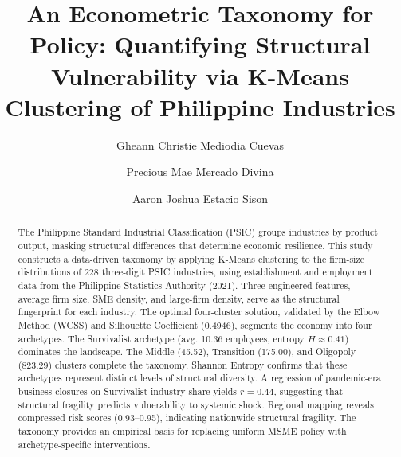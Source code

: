 \documentclass[acmtog, nonacm]{acmart}
\begin{document}
\title{\textbf{An Econometric Taxonomy for Policy: Quantifying Structural Vulnerability via K-Means Clustering of Philippine Industries}}


\author{Gheann Christie Mediodia Cuevas}

\author{Precious Mae Mercado Divina}

\author{Aaron Joshua Estacio Sison}



\begin{abstract}
The Philippine Standard Industrial Classification (PSIC) groups industries by product output, masking structural differences that determine economic resilience. This study constructs a data-driven taxonomy by applying K-Means clustering to the firm-size distributions of 228 three-digit PSIC industries, using establishment and employment data from the Philippine Statistics Authority (2021). Three engineered features, average firm size, SME density, and large-firm density, serve as the structural fingerprint for each industry. The optimal four-cluster solution, validated by the Elbow Method (WCSS) and Silhouette Coefficient (0.4946), segments the economy into four archetypes. The Survivalist archetype (avg. 10.36 employees, entropy \texorpdfstring{$H \approx 0.41$}{H is approximately 0.41}) dominates the landscape. The Middle (45.52), Transition (175.00), and Oligopoly (823.29) clusters complete the taxonomy. Shannon Entropy confirms that these archetypes represent distinct levels of structural diversity. A regression of pandemic-era business closures on Survivalist industry share yields \texorpdfstring{$r = 0.44$}{r = 0.44}, suggesting that structural fragility predicts vulnerability to systemic shock. Regional mapping reveals compressed risk scores (0.93--0.95), indicating nationwide structural fragility. The taxonomy provides an empirical basis for replacing uniform MSME policy with archetype-specific interventions.
\end{abstract}
\end{document}
